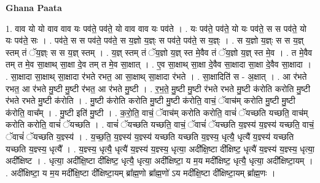 \documentclass[17pt]{extarticle}
\begin{document}
\textbf{Ghana Paata } \newline

1. वाव यो यो वाव वाव यः पव॑ते॒ पव॑ते॒ यो वाव वाव यः पव॑ते । . यः पव॑ते॒ पव॑ते॒ यो यः पव॑ते॒ स स पव॑ते॒ यो यः पव॑ते॒ सः । . पव॑ते॒ स स पव॑ते॒ पव॑ते॒ स य॒ज्ञो य॒ज्ञ्ः स पव॑ते॒ पव॑ते॒ स य॒ज्ञ्ः । . स य॒ज्ञो य॒ज्ञ्ः स स य॒ज्ञ् स्तम् तं ॅय॒ज्ञ्ः स स य॒ज्ञ् स्तम् । . य॒ज्ञ् स्तम् तं ॅय॒ज्ञो य॒ज्ञ् स्त मे॒वैव तं ॅय॒ज्ञो य॒ज्ञ् स्त मे॒व । . त मे॒वैव तम् त मे॒व सा॒क्षाथ् सा॒क्षा दे॒व तम् त मे॒व सा॒क्षात् । . ए॒व सा॒क्षाथ् सा॒क्षा दे॒वैव सा॒क्षादा सा॒क्षा दे॒वैव सा॒क्षादा । . सा॒क्षादा सा॒क्षाथ् सा॒क्षादा र॑भते रभत॒ आ सा॒क्षाथ् सा॒क्षादा र॑भते । . सा॒क्षादिति॑ स - अ॒क्षात् । . आ र॑भते रभत॒ आ र॑भते मु॒ष्टी मु॒ष्टी र॑भत॒ आ र॑भते मु॒ष्टी । . र॒भ॒ते॒ मु॒ष्टी मु॒ष्टी र॑भते रभते मु॒ष्टी क॑रोति करोति मु॒ष्टी र॑भते रभते मु॒ष्टी क॑रोति । . मु॒ष्टी क॑रोति करोति मु॒ष्टी मु॒ष्टी क॑रोति॒ वाचं॒ ॅवाच॑म् करोति मु॒ष्टी मु॒ष्टी क॑रोति॒ वाच᳚म् । . मु॒ष्टी इति॑ मु॒ष्टी । . क॒रो॒ति॒ वाचं॒ ॅवाच॑म् करोति करोति॒ वाचं॑ ॅयच्छति यच्छति॒ वाच॑म् करोति करोति॒ वाचं॑ ॅयच्छति । . वाचं॑ ॅयच्छति यच्छति॒ वाचं॒ ॅवाचं॑ ॅयच्छति य॒ज्ञ्स्य॑ य॒ज्ञ्स्य॑ यच्छति॒ वाचं॒ ॅवाचं॑ ॅयच्छति य॒ज्ञ्स्य॑ । . य॒च्छ॒ति॒ य॒ज्ञ्स्य॑ य॒ज्ञ्स्य॑ यच्छति यच्छति य॒ज्ञ्स्य॒ धृत्यै॒ धृत्यै॑ य॒ज्ञ्स्य॑ यच्छति यच्छति य॒ज्ञ्स्य॒ धृत्यै᳚ । . य॒ज्ञ्स्य॒ धृत्यै॒ धृत्यै॑ य॒ज्ञ्स्य॑ य॒ज्ञ्स्य॒ धृत्या॒ अदी᳚क्षि॒ष्टा दी᳚क्षिष्ट॒ धृत्यै॑ य॒ज्ञ्स्य॑ य॒ज्ञ्स्य॒ धृत्या॒ अदी᳚क्षिष्ट । . धृत्या॒ अदी᳚क्षि॒ष्टा दी᳚क्षिष्ट॒ धृत्यै॒ धृत्या॒ अदी᳚क्षिष्टा॒ य म॒य मदी᳚क्षिष्ट॒ धृत्यै॒ धृत्या॒ अदी᳚क्षिष्टा॒यम् । . अदी᳚क्षिष्टा॒ य म॒य मदी᳚क्षि॒ष्टा दी᳚क्षिष्टा॒यम् ब्रा᳚ह्म॒णो ब्रा᳚ह्म॒णो॑ ऽय मदी᳚क्षि॒ष्टा दी᳚क्षिष्टा॒यम् ब्रा᳚ह्म॒णः । \newline
\end{document}
